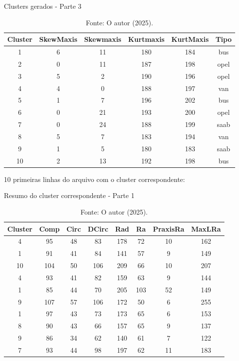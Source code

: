 \begin{table}[H]
\centering
\caption{Clusters gerados - Parte 3}
\begin{tabular}{|c|c|c|c|c|c|}
\hline
Cluster & SkewMaxis & Skewmaxis & Kurtmaxis & KurtMaxis & Tipo \\ \hline
1  & 6  & 11 & 180 & 184 & bus  \\ \hline
2  & 0  & 11 & 187 & 198 & opel \\ \hline
3  & 5  & 2  & 190 & 196 & opel \\ \hline
4  & 4  & 0  & 188 & 197 & van  \\ \hline
5  & 1  & 7  & 196 & 202 & bus  \\ \hline
6  & 0  & 21 & 193 & 200 & opel \\ \hline
7  & 0  & 24 & 188 & 199 & saab \\ \hline
8  & 5  & 7  & 183 & 194 & van  \\ \hline
9  & 1  & 5  & 180 & 183 & saab \\ \hline
10 & 2  & 13 & 192 & 198 & bus  \\ \hline
\end{tabular}
\caption*{Fonte: O autor (2025).}
\end{table}

10 primeiras linhas do arquivo com o cluster correspondente:

\begin{table}[H]
\centering
\caption{Resumo do cluster correspondente - Parte 1}
\begin{tabular}{|c|c|c|c|c|c|c|c|}
\hline
Cluster & Comp & Circ & DCirc & Rad & Ra & PraxisRa & MaxLRa \\ \hline
4  & 95  & 48  & 83  & 178 & 72  & 10 & 162 \\ \hline
1  & 91  & 41  & 84  & 141 & 57  & 9  & 149 \\ \hline
10 & 104 & 50  & 106 & 209 & 66  & 10 & 207 \\ \hline
4  & 93  & 41  & 82  & 159 & 63  & 9  & 144 \\ \hline
1  & 85  & 44  & 70  & 205 & 103 & 52 & 149 \\ \hline
9  & 107 & 57  & 106 & 172 & 50  & 6  & 255 \\ \hline
1  & 97  & 43  & 73  & 173 & 65  & 6  & 153 \\ \hline
8  & 90  & 43  & 66  & 157 & 65  & 9  & 137 \\ \hline
9  & 86  & 34  & 62  & 140 & 61  & 7  & 122 \\ \hline
7  & 93  & 44  & 98  & 197 & 62  & 11 & 183 \\ \hline
\end{tabular}
\caption*{Fonte: O autor (2025).}
\end{table}

